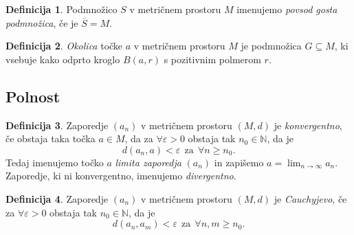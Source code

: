 \documentclass[11pt]{article}
\theoremstyle{definition}
\newtheorem{definicija}{Definicija}[section]
\theoremstyle{definition}
\theoremstyle{definition}
\begin{document}
\begin{definicija}

Podmnožico $S$ v metričnem prostoru $M$ imenujemo \textit{povsod gosta podmnožica}, če je $\overline{S} = M$.

\end{definicija}
\vspace{0.5cm}

\begin{definicija}

\textit{Okolica} točke $a$ v metričnem prostoru $M$ je podmnožica $G \subseteq M$, ki vsebuje kako odprto kroglo $B(a, r)$ s pozitivnim polmerom $r$.

\end{definicija}
\vspace{0.5cm}



\subsection{Polnost}
\vspace{0.5cm}

\begin{definicija}

Zaporedje $(a_n)$ v metričnem prostoru $(M, d)$ je \textit{konvergentno}, če obstaja taka točka $a \in M$, da za $\forall \varepsilon > 0$ obstaja tak $n_0 \in \mathbb{N}$, da je
$$d(a_n, a) < \varepsilon ~~\text{za}~~ \forall n \geq n_0.$$
Tedaj imenujemo točko $a$ \textit{limita zaporedja} $(a_n)$ in zapišemo $a = \lim_{n \rightarrow \infty} a_n$. Zaporedje, ki ni konvergentno, imenujemo \textit{divergentno}.

\end{definicija}
\vspace{0.5cm}

\begin{definicija}

Zaporedje $(a_n)$ v metričnem prostoru $(M, d)$ je \textit{Cauchyjevo}, če za $\forall \varepsilon > 0$ obstaja tak $n_0 \in \mathbb{N}$, da je 
$$d(a_n, a_m) < \varepsilon ~~\text{za}~~ \forall n, m \geq n_0.$$

\end{definicija}
\vspace{0.5cm}
\end{document}
